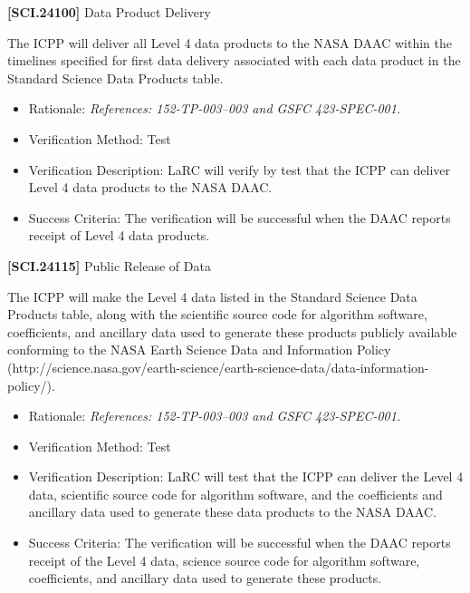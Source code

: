\documentclass[12pt,oneside,oldfontcommands]{memoir}
\begin{document}
\textbf{[SCI.24100]} Data Product Delivery

The \gls{ICPP} will deliver all Level 4 data products to the NASA \gls{DAAC} within the timelines specified for first data delivery associated with each data product in the Standard Science Data Products table.

\begin{itemize}
\item{} Rationale: \emph{References: 152-TP-003--003 and GSFC 423-SPEC-001.}

\item{} Verification Method: Test

\item{} Verification Description: \gls{LaRC} will verify by \gls{test} that the \gls{ICPP} can deliver Level 4 data products to the NASA \gls{DAAC}.

\item{} Success Criteria: The verification will be successful when the \gls{DAAC} reports receipt of Level 4 data products.

\end{itemize}

\textbf{[SCI.24115]} Public Release of Data

The \gls{ICPP} will make the Level 4 data listed in the Standard Science Data Products table, along with the scientific source code for algorithm software, coefficients, and ancillary data used to generate these products publicly available conforming to the NASA Earth Science Data and Information Policy (http:\slash \slash science.nasa.gov\slash earth-science\slash earth-science-data\slash data-information-policy\slash ).

\begin{itemize}
\item{} Rationale: \emph{References: 152-TP-003--003 and GSFC 423-SPEC-001.}

\item{} Verification Method: Test

\item{} Verification Description: \gls{LaRC} will \gls{test} that the \gls{ICPP} can deliver the Level 4 data, scientific source code for algorithm software, and the coefficients and ancillary data used to generate these data products to the NASA \gls{DAAC}.

\item{} Success Criteria: The verification will be successful when the \gls{DAAC} reports receipt of the Level 4 data, science source code for algorithm software, coefficients, and ancillary data used to generate these products.

\end{itemize}
\end{document}
